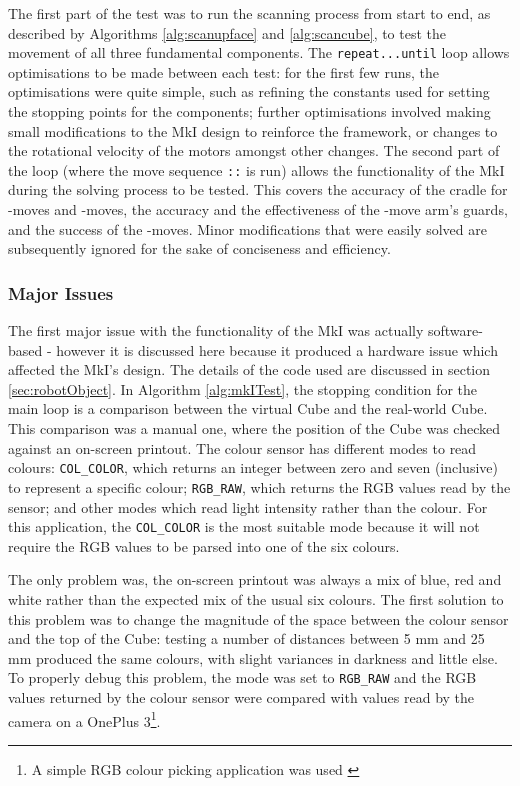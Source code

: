 \documentclass{report}
\newcommand{\movesequence}[1]{\uppercase{\texttt{:\formatmoves{#1}:}}}
\newcommand{\move}[1]{\uppercase{\texttt{\formatmovesnospace{#1}}}-move}
\begin{document}
	The first part of the test was to run the scanning process from start to end, as described by Algorithms \ref{alg:scanupface} and \ref{alg:scancube}, to test the movement of all three fundamental components. The \lstinline|repeat...until| loop allows optimisations to be made between each test: for the first few runs, the optimisations were quite simple, such as refining the constants used for setting the stopping points for the components; further optimisations involved making small modifications to the MkI design to reinforce the framework, or changes to the rotational velocity of the motors amongst other changes. The second part of the loop (where the move sequence \movesequence{y.y'x.y'd'd2d'x} is run) allows the functionality of the MkI during the solving process to be tested. This covers the accuracy of the cradle for \move{d}s and \move{y}s, the accuracy and the effectiveness of the \move{x} arm's guards, and the success of the \move{x}s. Minor modifications that were easily solved are subsequently ignored for the sake of conciseness and efficiency.
	
	\subsubsection{Major Issues} \label{sec:mkIMajorIssues}
	
	The first major issue with the functionality of the MkI was actually software-based - however it is discussed here because it produced a hardware issue which affected the MkI's design. The details of the code used are discussed in section \ref{sec:robotObject}. In Algorithm \ref{alg:mkITest}, the stopping condition for the main loop is a comparison between the virtual Cube and the real-world Cube. This comparison was a manual one, where the position of the Cube was checked against an on-screen printout. The colour sensor has different modes to read colours: \lstinline|COL_COLOR|, which returns an integer between zero and seven (inclusive) to represent a specific colour; \lstinline|RGB_RAW|, which returns the RGB values read by the sensor; and other modes which read light intensity rather than the colour. For this application, the \lstinline|COL_COLOR| is the most suitable mode because it will not require the RGB values to be parsed into one of the six colours.
	
	The only problem was, the on-screen printout was always a mix of blue, red and white rather than the expected mix of the usual six colours. The first solution to this problem was to change the magnitude of the space between the colour sensor and the top of the Cube: testing a number of distances between 5 \si{\milli\metre} and 25 \si{\milli\metre} produced the same colours, with slight variances in darkness and little else. To properly debug this problem, the mode was set to \lstinline|RGB_RAW| and the RGB values returned by the colour sensor were compared with values read by the camera on a OnePlus 3\footnote{A simple RGB colour picking application was used \cite{RangoApps2015}}.
	
\end{document}
